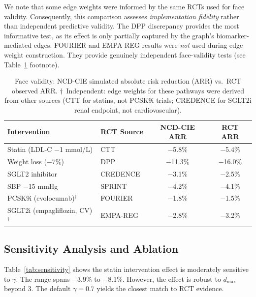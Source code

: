 \documentclass[runningheads]{llncs}
\begin{document}
We note that some edge weights were informed by the same RCTs used
for face validity.
Consequently, this comparison assesses \emph{implementation fidelity}
rather than independent predictive validity.
The DPP discrepancy provides the most informative test, as its effect
is only partially captured by the graph's biomarker-mediated edges.
FOURIER and EMPA-REG results were \emph{not} used during edge weight
construction.
They provide genuinely independent face-validity tests
(see Table~\ref{tab:rct} footnote).

\renewcommand{\arraystretch}{1.2}
\begin{table}[t]
\centering
\caption{Face validity: NCD-CIE simulated absolute risk reduction
(ARR) vs.\ RCT observed ARR.
$\dagger$~Independent: edge weights for these pathways were derived
from other sources (CTT for statins, not PCSK9i trials; CREDENCE for
SGLT2i renal endpoint, not cardiovascular).}
\label{tab:rct}
\small
\begin{tabular}{@{}llcc@{}}
\toprule
\textbf{Intervention} & \textbf{RCT Source} &
\textbf{NCD-CIE ARR} & \textbf{RCT ARR} \\
\midrule
Statin (LDL-C $-$1 mmol/L) & CTT~\cite{ctt2010}
  & $-$5.8\% & $-$5.4\% \\
Weight loss ($-$7\%) & DPP~\cite{knowler2002dpp}
  & $-$11.3\% & $-$16.0\% \\
SGLT2 inhibitor & CREDENCE~\cite{perkovic2019credence}
  & $-$3.1\% & $-$2.5\% \\
SBP $-$15 mmHg & SPRINT~\cite{sprint2015}
  & $-$4.2\% & $-$4.1\% \\
\midrule
PCSK9i (evolocumab)$^\dagger$ & FOURIER~\cite{sabatine2017fourier}
  & $-$1.8\% & $-$1.5\% \\
SGLT2i (empagliflozin, CV)$^\dagger$ & EMPA-REG~\cite{zinman2015empareg}
  & $-$2.8\% & $-$3.2\% \\
\bottomrule
\end{tabular}
\end{table}
\renewcommand{\arraystretch}{1.0}

\subsection{Sensitivity Analysis and Ablation}\label{sec:sensitivity}

Table~\ref{tab:sensitivity} shows the statin intervention effect is
moderately sensitive to $\gamma$.
The range spans $-$3.9\% to $-$8.1\%.
However, the effect is robust to $d_{\max}$ beyond 3.
The default $\gamma = 0.7$ yields the closest match to RCT evidence.
\end{document}

